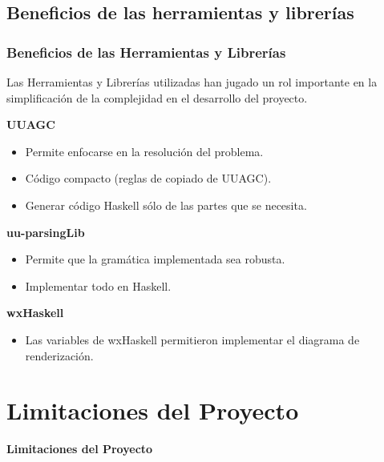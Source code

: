 \documentclass[12pt]{beamer}
\begin{document}
\subsection{Beneficios de las herramientas y librerías}
\begin{frame}
\frametitle{Beneficios de las Herramientas y Librerías}

\begin{block}{}
Las Herramientas y Librerías utilizadas han jugado un rol importante en la simplificación
de la complejidad en el desarrollo del proyecto.
\end{block}

\textbf{UUAGC}\\
\begin{itemize}
	\item Permite enfocarse en la resolución del problema.
	\item Código compacto (reglas de copiado de UUAGC).
	\item Generar código Haskell sólo de las partes que se necesita.
\end{itemize}
\textbf{uu-parsingLib}\\
\begin{itemize}
	\item Permite que la gramática implementada sea robusta.
	\item Implementar todo en Haskell.
\end{itemize}
\textbf{wxHaskell}\\
\begin{itemize}
	\item Las variables de wxHaskell permitieron implementar el
	diagrama de renderización.
\end{itemize}
\end{frame}

\section[Limitaciones]{Limitaciones del Proyecto}

\begin{frame}
\begin{center}
	\textbf{\Large Limitaciones del Proyecto}
\end{center}
\end{frame}
\end{document}
